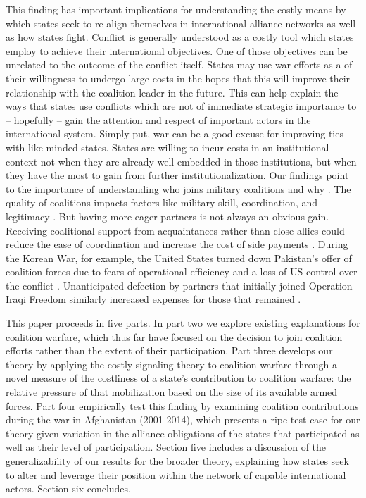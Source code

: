 \documentclass[12pt,letterpaper]{article}
\begin{document}
	This finding has important implications for understanding the costly means by which states seek to re-align themselves in international alliance networks as well as how states fight. Conflict is generally understood as a costly tool which states employ to achieve their international objectives. One of those objectives can be unrelated to the outcome of the conflict itself. States may use war efforts as a of their willingness to undergo large costs in the hopes that this will improve their relationship with the coalition leader in the future. This can help explain the ways that states use conflicts which are not of immediate strategic importance to -- hopefully -- gain the attention and respect of important actors in the international system. Simply put, war can be a good excuse for improving ties with like-minded states. States are willing to incur costs in an institutional context not when they are already well-embedded in those institutions, but when they have the most to gain from further institutionalization. Our findings point to the importance of understanding who joins military coalitions and why \citep[12-14]{wolford_politicsmilitarycoalitions_2015}. The quality of coalitions impacts factors like military skill, coordination, and legitimacy \citep{auerswald_natoafghanistanfighting_2014, saideman_ambivalentcoalitiondoing_2016, cranmer_coalitionqualitymultinational_2017, cappellazielinski_dictatorsfightingtogether_2018}. But having more eager partners is not always an obvious gain. Receiving coalitional support from acquaintances rather than close allies could reduce the ease of coordination and increase the cost of side payments \citep{papayoanou_intraalliancebargainingbosnia_1997, morrow_alliancesasymmetryalternative_1991, wolford_politicsmilitarycoalitions_2015}. During the Korean War, for example, the United States turned down Pakistan's offer of coalition forces due to fears of operational efficiency and a loss of US control over the conflict \citep{stueck_koreanwarinternational_1997}. Unanticipated defection by partners that initially joined Operation Iraqi Freedom similarly increased expenses for those that remained \citep[12-13]{mcinnis_varietiesdefectionstrategies_2018}.

	This paper proceeds in five parts. In part two we explore existing explanations for coalition warfare, which thus far have focused on the decision to join coalition efforts rather than the extent of their participation. Part three develops our theory by applying the costly signaling theory to coalition warfare through a novel measure of the costliness of a state's contribution to coalition warfare: the relative pressure of that mobilization based on the size of its available armed forces. Part four empirically test this finding by examining coalition contributions during the war in Afghanistan (2001-2014), which presents a ripe test case for our theory given variation in the alliance obligations of the states that participated as well as their level of participation. Section five includes a discussion of the generalizability of our results for the broader theory, explaining how states seek to alter and leverage their position within the network of capable international actors. Section six concludes.
\end{document}

